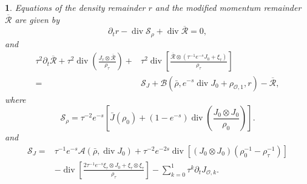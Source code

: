 \documentclass[english]{amsart}
\theoremstyle{plain}
\theoremstyle{definition}
\theoremstyle{remark}
\theoremstyle{plain}
\theoremstyle{plain}
\newtheorem{prop}[thm]{\protect\propositionname}
\theoremstyle{plain}
\providecommand{\propositionname}{Proposition}
\def\d{{\partial}}
\DeclareMathOperator{\diver}{div}
\numberwithin{equation}{section}
\begin{document}
\begin{prop}
Equations of the density remainder $r$ and the modified momentum remainder $\overline{\mathcal{R}}$ are given by
\begin{equation}\label{eq:dtr2}
\d_t r-\diver \mathcal{S}_\rho+\diver\overline{\mathcal{R}}=0,
\end{equation}
and
\begin{equation}\label{eq:dtR2}
\begin{aligned}
\tau^2\d_t\overline{\mathcal{R}}+\tau^2\diver\left(\frac{J_\tau\otimes\overline{\mathcal{R}}}{\rho_\tau}\right)+&\tau^2\diver\left[\frac{\overline{\mathcal{R}}\otimes(\tau^{-1}e^{-s}J_0+\xi_\tau)}{\rho_\tau}\right]\\
=&\mathcal{S}_J+\mathcal{B}(\bar\rho,e^{-s}\diver J_0+\rho_{\mathcal{O},1},r)-\overline{\mathcal{R}},
\end{aligned}
\end{equation}
where
\begin{equation}\label{eq:S_rho}
\mathcal{S}_\rho=\tau^{-2}e^{-s}\left[\bar J(\rho_0)+(1-e^{-s})\diver\left(\frac{J_0\otimes J_0}{\rho_0}\right)\right].
\end{equation}
and
\begin{equation}\label{eq:S2}
\begin{aligned}
\mathcal{S}_J=&\tau^{-1} e^{-s}\mathcal{A}(\bar\rho,\diver J_0)+\tau^{-2}e^{-2s}\diver\left[(J_0\otimes J_0)(\rho_0^{-1}-\rho_\tau^{-1})\right]\\
&-\diver\left[\frac{2\tau^{-1}e^{-s}\xi_\tau\otimes J_0+\xi_\tau\otimes \xi_\tau}{\rho_\tau}\right]-\sum_{k=0}^1 \tau^{k}\d_t J_{\mathcal{O},k}.
\end{aligned}
\end{equation}
\end{prop}
\end{document}
